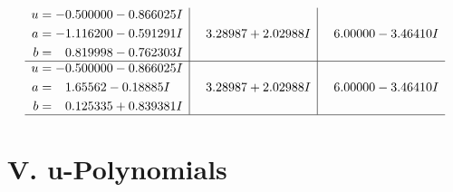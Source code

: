 \documentclass[1p]{elsarticle_modified}
\theoremstyle{definition}
\begin{document}
$$\begin{array}{c|c|c}
\begin{aligned}
u &= -0.500000 - 0.866025 I \\
a &= -1.116200 - 0.591291 I \\
b &= \phantom{-}0.819998 - 0.762303 I\end{aligned}
 & \phantom{-}3.28987 + 2.02988 I & \phantom{-}6.00000 - 3.46410 I \\ \hline\begin{aligned}
u &= -0.500000 - 0.866025 I \\
a &= \phantom{-}1.65562 - 0.18885 I \\
b &= \phantom{-}0.125335 + 0.839381 I\end{aligned}
 & \phantom{-}3.28987 + 2.02988 I & \phantom{-}6.00000 - 3.46410 I\\
 \hline 
 \end{array}$$\newpage
\newpage\renewcommand{\arraystretch}{1}
\centering \section*{ V. u-Polynomials}
\end{document}
